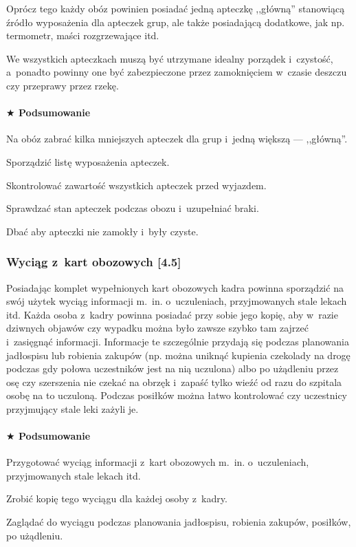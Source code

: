 \documentclass[a5paper,10pt,titlepage,twoside]{article}
\newcommand*{\thecheckbox}{\hss$\Box$} %
\newenvironment*{checklist}
{\list{}{%
\renewcommand*{\makelabel}[1]{\thecheckbox}}}
{\endlist}
\begin{document}
Oprócz tego każdy obóz powinien posiadać jedną apteczkę ,,główną'' stanowiącą źródło wyposażenia dla apteczek grup, ale także posiadającą dodatkowe, jak np. termometr, maści rozgrzewające itd.

We wszystkich apteczkach muszą być utrzymane idealny porządek i~czystość, a~ponadto powinny one być zabezpieczone przez zamoknięciem w~czasie deszczu czy przeprawy przez rzekę.
\paragraph{$\bigstar$ Podsumowanie}
\begin{checklist}
\item Na obóz zabrać kilka mniejszych apteczek dla grup i~jedną większą --- ,,główną''.
\item Sporządzić listę wyposażenia apteczek.
\item Skontrolować zawartość wszystkich apteczek przed wyjazdem.
\item Sprawdzać stan apteczek podczas obozu i~uzupełniać braki.
\item Dbać aby apteczki nie zamokły i~były czyste.
\end{checklist}
\subsubsection{Wyciąg z~kart obozowych [4.5]\label{wyciag-z-kart}}
Posiadając komplet wypełnionych kart obozowych kadra powinna sporządzić na swój użytek wyciąg informacji m.~in. o~uczuleniach, przyjmowanych stale lekach itd. Każda osoba z~kadry powinna posiadać przy sobie jego kopię, aby w~razie dziwnych objawów czy wypadku można było zawsze szybko tam zajrzeć i~zasięgnąć informacji. Informacje te szczególnie przydają się podczas planowania jadłospisu lub robienia zakupów (np. można uniknąć kupienia czekolady na drogę podczas gdy połowa uczestników jest na nią uczulona) albo po użądleniu przez osę czy szerszenia nie czekać na obrzęk i~zapaść tylko wieźć od razu do szpitala osobę na to uczuloną. Podczas posiłków można łatwo kontrolować czy uczestnicy przyjmujący stale leki zażyli je.
\paragraph{$\bigstar$ Podsumowanie}
\begin{checklist}
\item Przygotować wyciąg informacji z~kart obozowych m.~in. o~uczuleniach, przyjmowanych stale lekach itd.
\item Zrobić kopię tego wyciągu dla każdej osoby z~kadry.
\item Zaglądać do wyciągu podczas planowania jadłospisu, robienia zakupów, posiłków, po użądleniu.
\end{checklist}
\end{document}
